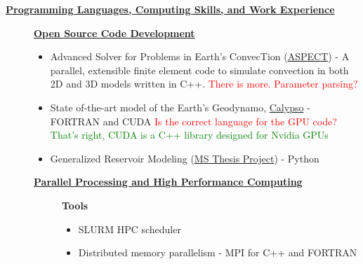 \documentclass[11pt]{ltxdoc}
\begin{document}
\vskip 18pt

\begin{center}
	\textbf{\underline{Programming Languages, Computing Skills, and Work Experience}}
\end{center}

  \begin{description}
  	
    \item[] \textbf{\underline{Open Source Code Development}}
    
      \begin{itemize}
      	
        \item Advanced Solver for Problems in Earth's ConvecTion (\href{https://github.com/geodynamics/aspect}{ASPECT}) - A parallel, extensible finite element code to simulate convection in both 2D and 3D models written in C++. \textcolor{red}{There is more. Parameter parsing?}
      
      \item State of-the-art model of the Earth's Geodynamo,
      \href{https://geodynamics.org/cig/software/calypso/}{Calypso} - FORTRAN and CUDA
      \textcolor{red}{Is the correct language for the GPU code?}
      \textcolor{green}{That's right, CUDA is a C++ library designed for Nvidia GPUs}
      
      \item Generalized Reservoir Modeling (\href{https://github.com/hlokavarapu/resecore.git}{MS Thesis Project}) - Python
            
    \end{itemize}
                                            
    \item[] \textbf{\underline{Parallel Processing and High Performance Computing}}
          
      \vskip 06pt
      
      \begin{description}
    
    	\item[] \textbf{Tools}
     
        \vskip 06pt   
        
        \begin{itemize} 
      
          \item SLURM HPC scheduler
                   
          \item Distributed memory parallelism - MPI for C++ and FORTRAN
      

\end{itemize}
\end{description}
\end{description}
\end{document}
